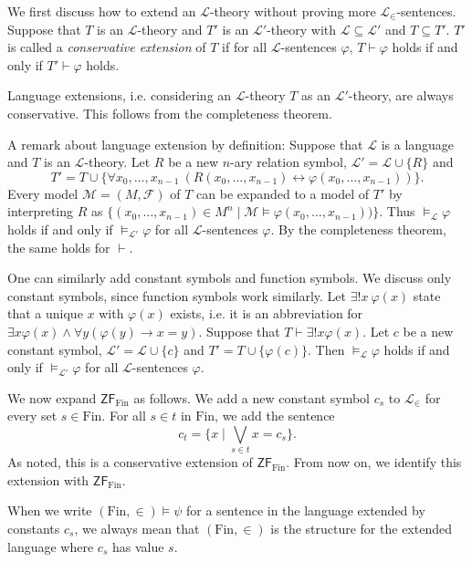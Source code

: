 \documentclass[a4paper, 11pt]{amsart}
\theoremstyle{remark}
\newcommand{\axiomft}[1]{\mathsf{#1}}
\newcommand{\ZF}{\axiomft{ZF}}
\newcommand{\Fin}{\mathrm{Fin}}
\newcommand{\cF}{\mathcal F}
\newcommand{\cL}{\mathcal L}
\newcommand{\cM}{\mathcal M}
\begin{document}
We first discuss how to extend an $\cL$-theory without proving more $\cL_\in$-sentences. 
Suppose that $T$ is an $\cL$-theory and $T'$ is an $\cL'$-theory with $\cL \subseteq \cL'$ and $T\subseteq T'$. 
$T'$ is called a \emph{conservative extension} of $T$ if for all $\cL$-sentences $\varphi$, $T\vdash \varphi$ holds if and only if $T'\vdash \varphi$ holds. 

Language extensions, i.e. considering an $\cL$-theory $T$ as an $\cL'$-theory, are always conservative. 
This follows from the completeness theorem. 

A remark about language extension by definition: 
Suppose that $\cL$ is a language and $T$ is an $\cL$-theory. 
Let $R$ be a new $n$-ary relation symbol, $\cL'=\cL\cup \{R\}$ and 
$$T'=T\cup \{ \forall x_0,\dots,x_{n-1}\ (R(x_0,\dots,x_{n-1}) \longleftrightarrow \varphi(x_0,\dots,x_{n-1})) \}.$$ 
Every model $\cM=(M,\cF)$ of $T$ can be expanded to a model of $T'$ by interpreting $R$ as $\{(x_0,\dots,x_{n-1})\in M^n \mid \cM\models \varphi(x_0,\dots,x_{n-1}))\}$. 
Thus $\vDash_\cL \varphi$ holds if and only if $\vDash_{\cL'} \varphi$ for all $\cL$-sentences $\varphi$. 
By the completeness theorem, the same holds for $\vdash$. 

One can similarly add constant symbols and function symbols.
We discuss only constant symbols, since function symbols work similarly.  
Let $\exists ! x\ \varphi(x)$ state that a unique $x$ with $\varphi(x)$ exists, i.e. it is an abbreviation for $\exists x \varphi(x) \wedge \forall y (\varphi(y) \rightarrow x=y)$. 
Suppose that $T\vdash \exists ! x \varphi(x)$. 
Let $c$ be a new constant symbol, $\cL'=\cL\cup \{c\}$ and $T'=T\cup \{ \varphi(c)\}$. 
Then $\vDash_\cL \varphi$ holds if and only if $\vDash_{\cL'} \varphi$ for all $\cL$-sentences $\varphi$. 


We now expand $\ZF_\Fin$ as follows. 
We add a new constant symbol $c_s$ to $\cL_{\in}$ for every set $s\in \Fin$. 
For all $s\in t$ in $\Fin$, we add the sentence 
$$ c_t = \{ x \mid \bigvee_{s\in t} x= c_s  \}.$$
As noted, this is a conservative extension of $\ZF_\Fin$. 
From now on, we identify this extension with $\ZF_\Fin$. 

When we write $(\Fin,\in)\models \psi$ for a sentence in the language extended by constants $c_s$, we always mean that $(\Fin,\in)$ is the  structure for the extended language where $c_s$ has value $s$. 
\end{document}
